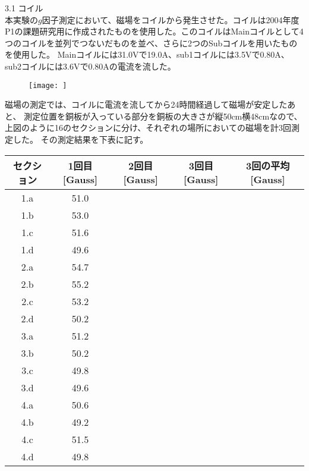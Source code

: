 3.1  コイル\\
  本実験の\(g\)因子測定において、磁場をコイルから発生させた。コイルは2004年度P1の課題研究用に作成されたものを使用した。このコイルはMainコイルとして4つのコイルを並列でつないだものを並べ、さらに2つのSubコイルを用いたものを使用した。
Mainコイルには31.0Vで19.0A、sub1コイルには3.5Vで0.80A、sub2コイルには3.6Vで0.80Aの電流を流した。
\begin{figure}[h]
  \texttt{[image: ]}
\end{figure}

磁場の測定では、コイルに電流を流してから24時間経過して磁場が安定したあと、
測定位置を銅板が入っている部分を銅板の大きさが縦50cm横48cmなので、上図のように16のセクションに分け、それぞれの場所においての磁場を計3回測定した。
その測定結果を下表に記す。
\begin{center}
\begin{tabular}{c|ccc|c}\hline
  セクション&1回目[Gauss]&2回目[Gauss]&3回目[Gauss]&3回の平均[Gauss]\\ \hline
  1.a & 51.0 & & & \\
  1.b & 53.0 & & & \\
  1.c & 51.6 & & & \\
  1.d & 49.6 & & & \\
  2.a & 54.7 & & & \\
  2.b & 55.2 & & & \\
  2.c & 53.2 & & & \\
  2.d & 50.2 & & & \\
  3.a & 51.2 & & & \\
  3.b & 50.2 & & & \\
  3.c & 49.8 & & & \\
  3.d & 49.6 & & & \\
  4.a & 50.6 & & & \\
  4.b & 49.2 & & & \\
  4.c & 51.5 & & & \\
  4.d & 49.8 & & & \\
\end{tabular}
\end{center}
